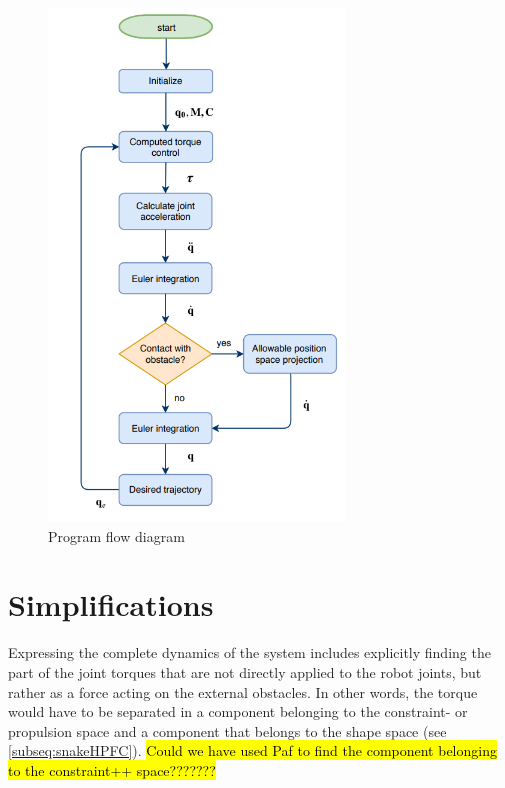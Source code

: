 \begin{figure}
    \centering
    \includegraphics[width=0.7\textwidth]{figures/sysflow.PNG}
    \caption{Program flow diagram}
    \label{fig:prog_flow}
\end{figure}




\section{Simplifications}

Expressing the complete dynamics of the system includes explicitly finding the part of the joint torques that are not directly applied to the robot joints, but rather as a force acting on the external obstacles. In other words, the torque would have to be separated in a component belonging to the constraint- or propulsion space and a component that belongs to the shape space (see \ref{subseq:snakeHPFC}). \hl{Could we have used Paf to find the component belonging to the constraint++ space???????}

